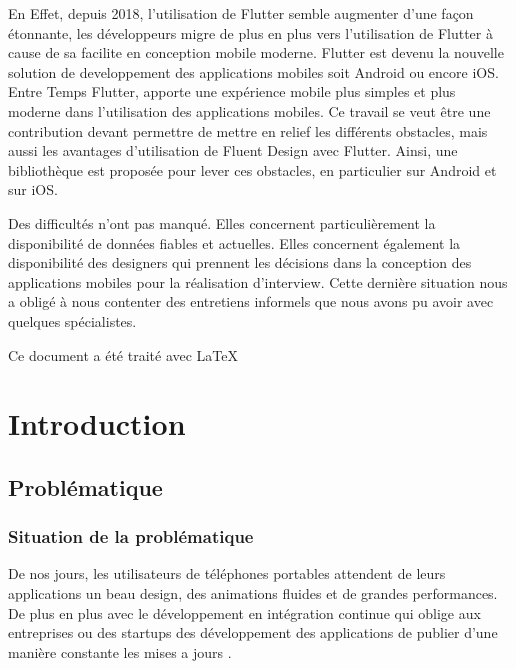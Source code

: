 \documentclass[a4paper,12pt]{report}
\begin{document}
    
    En Effet, depuis 2018, l'utilisation de Flutter semble augmenter d'une façon étonnante, les développeurs migre de plus en plus vers l'utilisation de Flutter à cause de sa facilite en conception mobile moderne. 
    Flutter est devenu la nouvelle solution de developpement des applications mobiles soit Android ou encore iOS. Entre Temps Flutter, apporte une expérience mobile plus simples et plus moderne dans l'utilisation des applications mobiles.
    Ce travail se veut être une contribution devant permettre de mettre en relief les différents obstacles, mais aussi les avantages d'utilisation de Fluent Design avec Flutter. Ainsi, une bibliothèque est proposée pour lever ces obstacles, en particulier sur Android et sur iOS.
    
    
    Des difficultés n’ont pas manqué. Elles concernent particulièrement la disponibilité de données fiables et actuelles. Elles concernent également la disponibilité des designers qui prennent les décisions dans la conception des applications mobiles pour la réalisation d’interview. Cette dernière situation nous a obligé à nous contenter des entretiens informels que nous avons pu avoir avec quelques spécialistes.

    \vspace{20px}
    \begin{flushright}
        Ce document a été traité avec \LaTeX
    \end{flushright}
    
    \chapter*{Introduction}

        \section*{Problématique}

            \subsection*{Situation de la problématique}

                De nos jours, les utilisateurs de téléphones portables attendent de leurs applications un beau design, 
                des animations fluides et de grandes performances. 
                De plus en plus avec le développement en intégration continue qui oblige aux entreprises ou des 
                startups des développement des applications de publier d’une manière constante les mises a jours .
\end{document}
